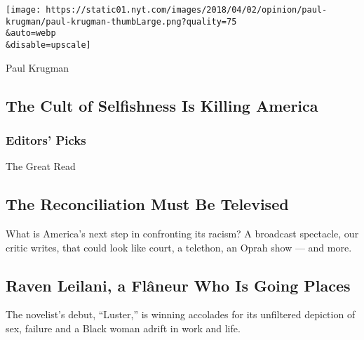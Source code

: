 \href{/2020/07/27/opinion/us-republicans-coronavirus.html}{}

\texttt{[image: https://static01.nyt.com/images/2018/04/02/opinion/paul-krugman/paul-krugman-thumbLarge.png?quality=75\\\&auto=webp\\\&disable=upscale]}

Paul Krugman

\hypertarget{the-cult-of-selfishness-is-killing-america}{%
\subsection{The Cult of Selfishness Is Killing
America}\label{the-cult-of-selfishness-is-killing-america}}

\hypertarget{editors-picks}{%
\subsubsection{Editors' Picks}\label{editors-picks}}

\href{/2020/07/30/arts/television/the-moment-racism-tv.html}{}

The Great Read

\hypertarget{the-reconciliation-must-be-televised}{%
\subsection{The Reconciliation Must Be
Televised}\label{the-reconciliation-must-be-televised}}

\href{/2020/07/30/arts/television/the-moment-racism-tv.html}{}

What is America's next step in confronting its racism? A broadcast
spectacle, our critic writes, that could look like court, a telethon, an
Oprah show --- and more.

\href{/2020/07/30/arts/television/the-moment-racism-tv.html}{}

\href{/2020/07/31/books/raven-leilani-luster.html}{}

\hypertarget{raven-leilani-a-fluxe2neur-who-is-going-places}{%
\subsection{Raven Leilani, a Flâneur Who Is Going
Places}\label{raven-leilani-a-fluxe2neur-who-is-going-places}}

The novelist's debut, ``Luster,'' is winning accolades for its
unfiltered depiction of sex, failure and a Black woman adrift in work
and life.

\href{/2020/07/31/books/raven-leilani-luster.html}{}

